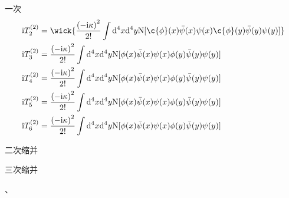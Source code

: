 一次
\begin{equation}
    \begin{aligned}
        \mathrm{i}T_{2}^{(2)}&=\wick{ \frac{\left( -\mathrm{i}\kappa \right) ^2}{2!}\int{\mathrm{d}^4x\mathrm{d}^4y\mathrm{N} [ \c{\phi}(x)\bar{\psi}(x)\psi(x)\c{\phi}(y)\bar{\psi}(y)\psi (y)]} }
\\
\mathrm{i}T_{3}^{(2)}&=\frac{\left( -\mathrm{i}\kappa \right) ^2}{2!}\int{\mathrm{d}^4x\mathrm{d}^4y\mathrm{N} [ \phi (x)\bar{\psi}(x)\psi (x)\phi (y)\bar{\psi}(y)\psi (y)]}
\\
\mathrm{i}T_{4}^{(2)}&=\frac{\left( -\mathrm{i}\kappa \right) ^2}{2!}\int{\mathrm{d}^4x\mathrm{d}^4y\mathrm{N} [ \phi (x)\bar{\psi}(x)\psi (x)\phi (y)\bar{\psi}(y)\psi (y)]}
\\
\mathrm{i}T_{5}^{(2)}&=\frac{\left( -\mathrm{i}\kappa \right) ^2}{2!}\int{\mathrm{d}^4x\mathrm{d}^4y\mathrm{N} [ \phi (x)\bar{\psi}(x)\psi (x)\phi (y)\bar{\psi}(y)\psi (y)]}
\\
\mathrm{i}T_{6}^{(2)}&=\frac{\left( -\mathrm{i}\kappa \right) ^2}{2!}\int{\mathrm{d}^4x\mathrm{d}^4y\mathrm{N} [ \phi (x)\bar{\psi}(x)\psi (x)\phi (y)\bar{\psi}(y)\psi (y)]}
    \end{aligned}
\end{equation}

二次缩并





三次缩并




、



























